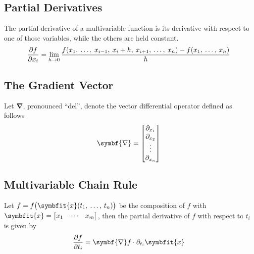 \documentclass{article}
\begin{document}
\subsection{Partial Derivatives}
\begin{definition}
    The partial derivative of a multivariable function is its derivative with
    respect to one of those variables, while the others are held constant.
    \begin{equation*}
        \pdv{f}{x_i} = \lim_{h \to 0} \frac{f(x_1,\: \ldots,\: x_{i-1},\: x_i+h,\: x_{i+1},\: \ldots,\: x_n) - f(x_1,\: \ldots,\: x_n)}{h}
    \end{equation*}
\end{definition}
\subsection{The Gradient Vector}
\begin{definition}
    Let \(\symbf{\nabla}\), pronounced ``del'', denote the vector differential
    operator defined as follows
    \begin{equation*}
        \symbf{\nabla} = \mqty[\partial_{x_1} \\ \partial_{x_2} \\ \vdots \\ \partial_{x_n}]
    \end{equation*}
\end{definition}
\subsection{Multivariable Chain Rule}
\begin{definition}
    Let \(f=f\bigl(\symbfit{x}(t_1,\: \ldots,\: t_n)\bigr)\) be the composition of \(f\) with
    \(\symbfit{x}=\mqty[x_1 & \cdots & x_m]\), then the partial derivative of \(f\)
    with respect to \(t_i\) is given by
    \begin{equation*}
        \pdv{f}{t_i} = \symbf{\nabla}f \cdot \partial_{t_i}\symbfit{x}
    \end{equation*}
\end{definition}
\end{document}

